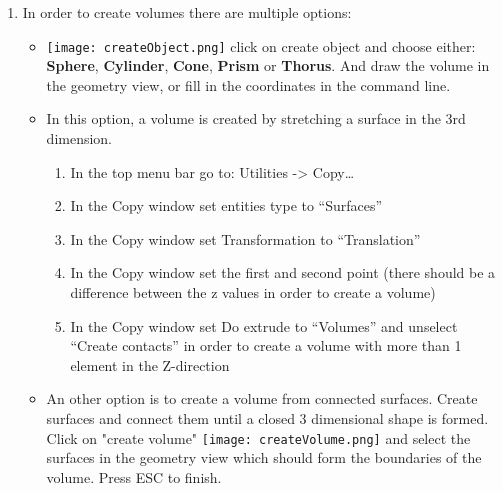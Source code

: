 \begin{enumerate}
	\setlength\itemsep{2mm}
	\item In order to create volumes there are multiple options:
		\begin{itemize}
		\setlength\itemsep{2mm}
		
		\item  \texttt{[image: createObject.png]}   click on create object and choose either: \textbf{Sphere}, \textbf{Cylinder}, \textbf{Cone}, \textbf{Prism} or \textbf{Thorus}. And draw the volume in the geometry view, or fill in the coordinates in the command line.
		
		\item In this option, a volume is created by stretching a surface in the 3rd dimension. 
		\begin{enumerate}
			\setlength\itemsep{2mm}
			\item In the top menu bar go to: Utilities -> Copy… 
			\item In the Copy window set entities type to “Surfaces”
			\item In the Copy window set Transformation to “Translation”
			\item In the Copy window set the first and second point (there should be a difference between the z values in order to create a volume)
			\item In the Copy window set Do extrude to “Volumes”  and unselect “Create contacts” in order to create a volume with more than 1 element in the Z-direction
		\end{enumerate}
		
		\item An other option is to create a volume from connected surfaces. Create surfaces and connect them until a closed 3 dimensional shape is formed. Click on "create volume" \texttt{[image: createVolume.png]} and select the surfaces in the geometry view which should form the boundaries of the volume. Press ESC to finish.
		
		\end{itemize}
	
	
\end{enumerate}